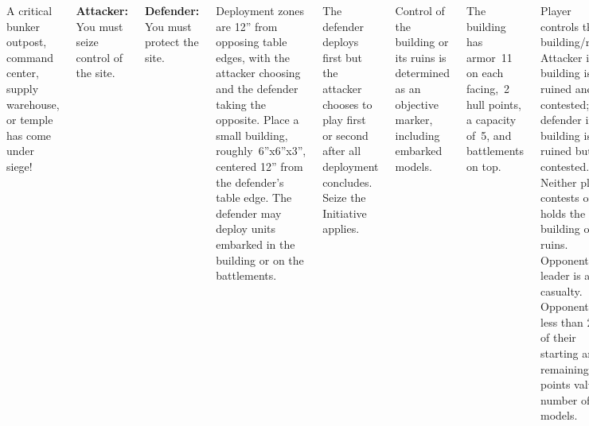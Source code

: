 
\begin{columns}

  A critical bunker outpost, command center, supply warehouse, or
  temple has come under siege!

{\bf Attacker:} You must seize control of the site.

{\bf Defender:} You must protect the site.

%

Deployment zones are 12'' from opposing table edges, with the attacker
choosing and the defender taking the opposite.  Place a small
building, roughly~6''x6''x3'', centered 12'' from the defender's table
edge.  The defender may deploy units embarked in the building or on
the battlements.

%

The defender deploys first but the attacker chooses to play first or
second after all deployment concludes.  Seize the Initiative applies.

Control of the building or its ruins is determined as an objective
marker, including embarked models.

The building has armor~11 on each facing,~2 hull points, a capacity
of~5, and battlements on top.

\columnbreak

\scoringbox%
{Player controls the building/ruins.}%
{Attacker if the building is ruined and contested; defender if the
  building is not ruined but is contested.}%
{Neither player contests or holds the building or its ruins.}%
{Opponent's leader is a casualty.}%
{Opponent has less than 25\% of their starting army remaining, by
  points value or number of models.}

\end{columns}
